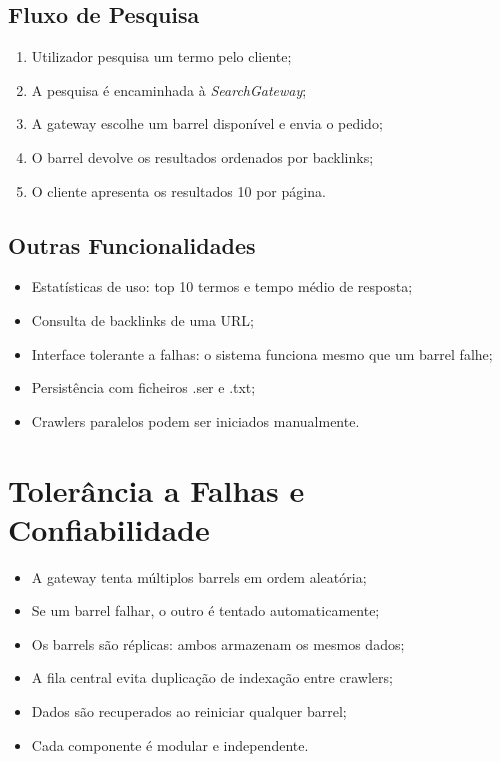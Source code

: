 \documentclass{article}
\begin{document}
\subsection{Fluxo de Pesquisa}
\begin{enumerate}
    \item Utilizador pesquisa um termo pelo cliente;
    \item A pesquisa é encaminhada à \textit{SearchGateway};
    \item A gateway escolhe um barrel disponível e envia o pedido;
    \item O barrel devolve os resultados ordenados por backlinks;
    \item O cliente apresenta os resultados 10 por página.
\end{enumerate}

\subsection{Outras Funcionalidades}
\begin{itemize}
    \item Estatísticas de uso: top 10 termos e tempo médio de resposta;
    \item Consulta de backlinks de uma URL;
    \item Interface tolerante a falhas: o sistema funciona mesmo que um barrel falhe;
    \item Persistência com ficheiros .ser e .txt;
    \item Crawlers paralelos podem ser iniciados manualmente.
\end{itemize}

\newpage

\section{Tolerância a Falhas e Confiabilidade}
\begin{itemize}
    \item A gateway tenta múltiplos barrels em ordem aleatória;
    \item Se um barrel falhar, o outro é tentado automaticamente;
    \item Os barrels são réplicas: ambos armazenam os mesmos dados;
    \item A fila central evita duplicação de indexação entre crawlers;
    \item Dados são recuperados ao reiniciar qualquer barrel;
    \item Cada componente é modular e independente.
\end{itemize}
\end{document}
